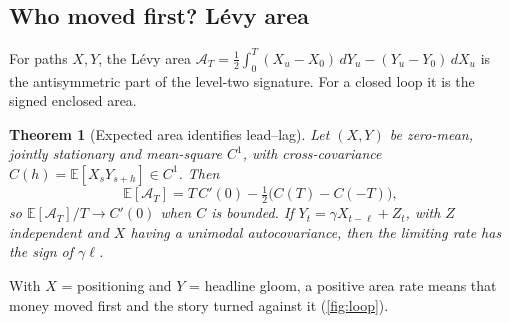 \documentclass[10pt,twocolumn,letterpaper]{article}
\theoremstyle{plain}
\newtheorem{theorem}{Theorem}
\theoremstyle{definition}
\theoremstyle{remark}
\newcommand{\E}{\mathbb{E}}
\begin{document}
\subsection{Who moved first? L\'evy area}\label{sec:leadlag}

For paths $X,Y$, the L\'evy area $\mathcal{A}_T=\tfrac12\int_0^T(X_u-X_0)\,dY_u-(Y_u-Y_0)\,dX_u$ is the antisymmetric part of the level-two signature. For a closed loop it is the signed enclosed area.

\begin{theorem}[Expected area identifies lead--lag]\label{thm:levy}
Let $(X,Y)$ be zero-mean, jointly stationary and mean-square $C^1$, with cross-covariance $C(h)=\E[X_sY_{s+h}]\in C^1$. Then
\[
  \E[\mathcal{A}_T]=T\,C'(0)-\tfrac12\big(C(T)-C(-T)\big),
\]
so $\E[\mathcal{A}_T]/T\to C'(0)$ when $C$ is bounded. If $Y_t=\gamma X_{t-\ell}+Z_t$, with $Z$ independent and $X$ having a unimodal autocovariance, then the limiting rate has the sign of $\gamma\ell$.
\end{theorem}

With $X$ = positioning and $Y$ = headline gloom, a positive area rate means that money moved first and the story turned against it (\cref{fig:loop}).
\end{document}

